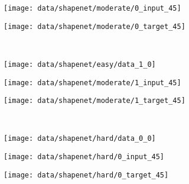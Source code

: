 \begin{figure}[h]
\begin{subfigure}[t]{0.425\textwidth}
  \end{subfigure}
  \begin{subfigure}[t]{0.2\textwidth}
    \vspace{0px}
    \texttt{[image: data/shapenet/moderate/0\_input\_45]}
  \end{subfigure}
  \begin{subfigure}[t]{0.2\textwidth}
    \vspace{0px}
    \texttt{[image: data/shapenet/moderate/0\_target\_45]}
  \end{subfigure}\\[2px]
  \begin{subfigure}[t]{0.425\textwidth}
    \vspace{0px}
    \texttt{[image: data/shapenet/easy/data\_1\_0]}
  \end{subfigure}
  \begin{subfigure}[t]{0.2\textwidth}
    \vspace{0px}
    \texttt{[image: data/shapenet/moderate/1\_input\_45]}
  \end{subfigure}
  \begin{subfigure}[t]{0.2\textwidth}
    \vspace{0px}
    \texttt{[image: data/shapenet/moderate/1\_target\_45]}
  \end{subfigure}\\[2px]
  \begin{subfigure}[t]{0.425\textwidth}
    \vspace{0px}
    \texttt{[image: data/shapenet/hard/data\_0\_0]}
  \end{subfigure}
  \begin{subfigure}[t]{0.2\textwidth}
    \vspace{0px}
    \texttt{[image: data/shapenet/hard/0\_input\_45]}
  \end{subfigure}
  \begin{subfigure}[t]{0.2\textwidth}
    \vspace{0px}
    \texttt{[image: data/shapenet/hard/0\_target\_45]}
  \end{subfigure}\\[2px]
  \begin{subfigure}[t]{0.425\textwidth}
    \vspace{0px}

\end{subfigure}
\end{figure}

